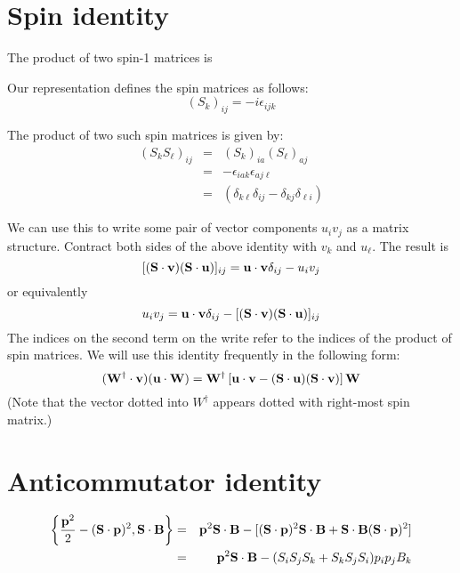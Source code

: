 \section{Spin identity}
The product of two spin-1 matrices is

Our representation defines the spin matrices as follows:
$${(S_k)}_{ij}=-i \epsilon_{ijk}$$



The product of two such spin matrices is given by:
\begin{eqnarray*}
{(S_k S_\ell)}_{ij} 
	& = & {(S_k)}_{ia} {(S_\ell)}_{aj} \\
	& = & -\epsilon_{iak} \epsilon_{aj\ell} \\
	& = & (\delta_{k\ell} \delta_{ij} - \delta_{kj} \delta_{\ell i} )
\end{eqnarray*}

We can use this to write some pair of vector components $u_i v_j$ as a matrix structure.  Contract both sides of the above identity with $v_k$ and $u_\ell$.  The result is
\[
	[(\mathbf{S} \cdot \mathbf{v} )(\mathbf{S} \cdot \mathbf{u})]_{ij}
		= \mathbf{u} \cdot \mathbf{v} \delta_{ij} - u_i v_j 
\]
or equivalently
\[
	u_i v_j = \mathbf{u} \cdot \mathbf{v} \delta_{ij}  - [(\mathbf{S} \cdot \mathbf{v} )(\mathbf{S} \cdot \mathbf{u})]_{ij}
\]
The indices on the second term on the write refer to the indices of the product of spin matrices.  We will use this identity frequently in the following form:
\[
	(\mathbf{W^\dagger} \cdot \mathbf{v} )( \mathbf{u} \cdot \mathbf{W} )
		=	\mathbf{W^\dagger} \left[ \mathbf{u} \cdot \mathbf{v} - (\mathbf{S} \cdot \mathbf{u} )(\mathbf{S} \cdot \mathbf{v}) \right ] \mathbf{W}
\]
(Note that the vector dotted into $W^\dagger$ appears dotted with right-most spin matrix.)


\section{Anticommutator identity}
\begin{eqnarray*}
\left \{ \frac{\mathbf{p}^2}{2} - (\mathbf{S} \cdot \mathbf{p})^2, \mathbf{S} \cdot \mathbf{B} \right \}
	&=&	 \mathbf{p}^2 \mathbf{S} \cdot \mathbf{B} - [(\mathbf{S} \cdot \mathbf{p})^2 \mathbf{S} \cdot \mathbf{B} + \mathbf{S} \cdot \mathbf{B} (\mathbf{S} \cdot \mathbf{p})^2  ]	\\
	&=&	 \mathbf{p}^2 \mathbf{S} \cdot \mathbf{B} - (S_i S_j S_k + S_k S_j S_i) p_i p_j B_k
\end{eqnarray*}

